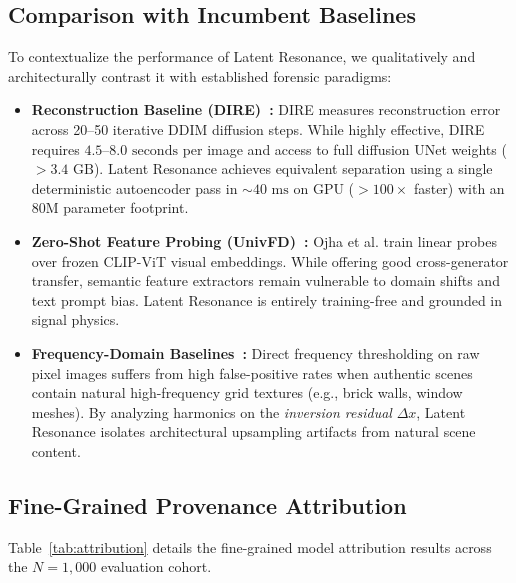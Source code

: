 \documentclass[11pt]{article}
\theoremstyle{definition}
\begin{document}
\subsection{Comparison with Incumbent Baselines}
To contextualize the performance of Latent Resonance, we qualitatively and architecturally contrast it with established forensic paradigms:
\begin{itemize}
    \item \textbf{Reconstruction Baseline (DIRE)~\citep{wang2023dire}:} DIRE measures reconstruction error across 20--50 iterative DDIM diffusion steps. While highly effective, DIRE requires $4.5\text{--}8.0\text{ seconds}$ per image and access to full diffusion UNet weights ($>3.4\text{ GB}$). Latent Resonance achieves equivalent separation using a single deterministic autoencoder pass in $\sim 40\text{ ms}$ on GPU ($>100\times$ faster) with an $80\text{M}$ parameter footprint.
    \item \textbf{Zero-Shot Feature Probing (UnivFD)~\citep{ojha2023towards}:} Ojha et al. train linear probes over frozen CLIP-ViT visual embeddings. While offering good cross-generator transfer, semantic feature extractors remain vulnerable to domain shifts and text prompt bias. Latent Resonance is entirely training-free and grounded in signal physics.
    \item \textbf{Frequency-Domain Baselines~\citep{wang2020cnn,corvi2023detection}:} Direct frequency thresholding on raw pixel images suffers from high false-positive rates when authentic scenes contain natural high-frequency grid textures (e.g., brick walls, window meshes). By analyzing harmonics on the \textit{inversion residual} $\Delta x$, Latent Resonance isolates architectural upsampling artifacts from natural scene content.
\end{itemize}

\subsection{Fine-Grained Provenance Attribution}
Table~\ref{tab:attribution} details the fine-grained model attribution results across the $N=1,000$ evaluation cohort.
\end{document}

